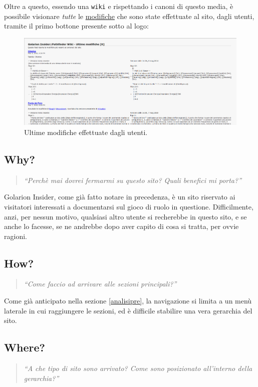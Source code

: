 Oltre a questo, essendo una \texttt{wiki} e rispettando i canoni di questo media, è possibile visionare \emph{tutte} le
\href{http://golarion.altervista.org/api.php?hidebots=1&days=7&limit=50&hidecategorization=1&action=feedrecentchanges&feedformat=atom}{modifiche}
che sono state effettuate al sito, dagli utenti, tramite il primo bottone presente sotto al logo: 

\begin{figure}[hbt]
    \includegraphics[width=\textwidth]{img/ultime_modifiche.png}
    \caption{Ultime modifiche effettuate dagli utenti.}
\end{figure}

\subsection{Why?}
\begin{quote}
    \emph{``Perchè mai dovrei fermarmi su questo sito? Quali benefici mi porta?''}
\end{quote}

Golarion Insider, come già fatto notare in precedenza, è un sito riservato ai visitatori interessati a documentarsi sul
gioco di ruolo in questione. Difficilmente, anzi, per nessun motivo, qualsiasi altro utente si recherebbe in questo sito, e
se anche lo facesse, se ne andrebbe dopo aver capito di cosa si tratta, per ovvie ragioni.

\subsection{How?}
\begin{quote}
    \emph{``Come faccio ad arrivare alle sezioni principali?''}
\end{quote}
Come già anticipato nella sezione \ref{analisipre}, la navigazione si limita a un menù laterale in cui raggiungere le sezioni,
ed è difficile stabilire una vera gerarchia del sito.

\subsection{Where?}
\begin{quote}
    \emph{``A che tipo di sito sono arrivato? Come sono posizionato all'interno della gerarchia?''}
\end{quote}


